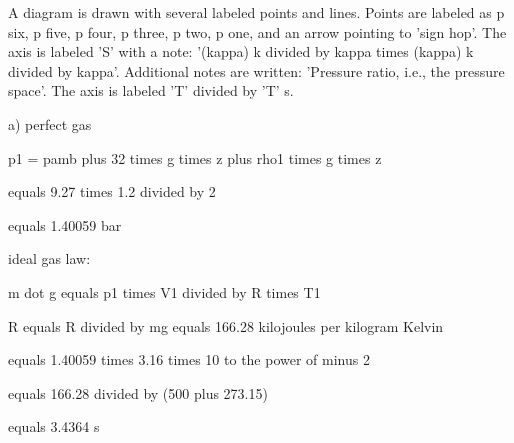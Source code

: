 A diagram is drawn with several labeled points and lines. Points are labeled as p six, p five, p four, p three, p two, p one, and an arrow pointing to 'sign hop'. The axis is labeled 'S' with a note: '(kappa) k divided by kappa times (kappa) k divided by kappa'. Additional notes are written: 'Pressure ratio, i.e., the pressure space'. The axis is labeled 'T' divided by 'T' s.

a) perfect gas

p1 = pamb plus 32 times g times z plus rho1 times g times z

equals 9.27 times 1.2 divided by 2

equals 1.40059 bar

ideal gas law:

m dot g equals p1 times V1 divided by R times T1

R equals R divided by mg equals 166.28 kilojoules per kilogram Kelvin

equals 1.40059 times 3.16 times 10 to the power of minus 2

equals 166.28 divided by (500 plus 273.15)

equals 3.4364 s